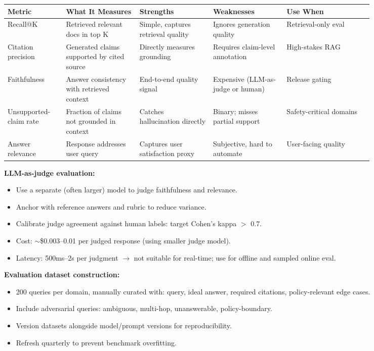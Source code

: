 \small
\begin{tabular}{|p{0.13\linewidth}|p{0.17\linewidth}|p{0.17\linewidth}|p{0.17\linewidth}|p{0.20\linewidth}|}
\hline
\textbf{Metric} & \textbf{What It Measures} & \textbf{Strengths} & \textbf{Weaknesses} & \textbf{Use When} \\
\hline
Recall@K & Retrieved relevant docs in top K & Simple, captures retrieval quality & Ignores generation quality & Retrieval-only eval \\
\hline
Citation precision & Generated claims supported by cited source & Directly measures grounding & Requires claim-level annotation & High-stakes RAG \\
\hline
Faithfulness & Answer consistency with retrieved context & End-to-end quality signal & Expensive (LLM-as-judge or human) & Release gating \\
\hline
Unsupported-claim rate & Fraction of claims not grounded in context & Catches hallucination directly & Binary; misses partial support & Safety-critical domains \\
\hline
Answer relevance & Response addresses user query & Captures user satisfaction proxy & Subjective, hard to automate & User-facing quality \\
\hline
\end{tabular}
\normalsize

\textbf{LLM-as-judge evaluation:}

\begin{itemize}
  \item Use a separate (often larger) model to judge faithfulness and relevance.
  \item Anchor with reference answers and rubric to reduce variance.
  \item Calibrate judge agreement against human labels: target Cohen's kappa $>$ 0.7.
  \item Cost: $\sim$\$0.003--0.01 per judged response (using smaller judge model).
  \item Latency: 500ms--2s per judgment $\rightarrow$ not suitable for real-time; use for offline and sampled online eval.
\end{itemize}

\textbf{Evaluation dataset construction:}

\begin{itemize}
  \item 200 queries per domain, manually curated with: query, ideal answer, required citations, policy-relevant edge cases.
  \item Include adversarial queries: ambiguous, multi-hop, unanswerable, policy-boundary.
  \item Version datasets alongside model/prompt versions for reproducibility.
  \item Refresh quarterly to prevent benchmark overfitting.
\end{itemize}

